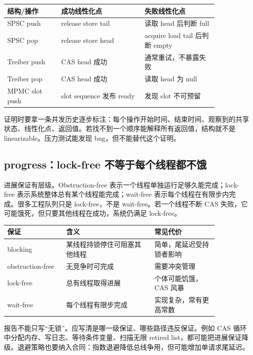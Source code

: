 \begin{center}
\begin{tabular}{p{0.22\linewidth}p{0.34\linewidth}p{0.30\linewidth}}
\toprule
结构/操作 & 成功线性化点 & 失败线性化点 \\
\midrule
SPSC push & release store tail & 读取 head 后判断 full \\
SPSC pop & release store head & acquire load tail 后判断 empty \\
Treiber push & CAS head 成功 & 通常重试，不暴露失败 \\
Treiber pop & CAS head 成功 & 读取 head 为 null \\
MPMC slot push & slot sequence 发布 ready & 发现 slot 不可预留 \\
\bottomrule
\end{tabular}
\end{center}

证明时要拿一条并发历史逐步标注：每个操作开始时间、结束时间、观察到的共享状态、线性化点、返回值。若找不到一个顺序能解释所有返回值，结构就不是 linearizable。压力测试能发现 bug，但不能替代这个证明。

\subsection{progress：lock-free 不等于每个线程都不饿}

进展保证有层级。Obstruction-free 表示一个线程单独运行足够久能完成；lock-free 表示系统整体总有某个线程能完成；wait-free 表示每个线程在有限步内完成。很多工程队列只是 lock-free，不是 wait-free。若一个线程不断 CAS 失败，它可能饿死，但只要其他线程在成功，系统仍满足 lock-free。

\begin{center}
\begin{tabular}{p{0.24\linewidth}p{0.36\linewidth}p{0.26\linewidth}}
\toprule
保证 & 含义 & 常见代价 \\
\midrule
blocking & 某线程持锁停住可阻塞其他线程 & 简单，尾延迟受持锁者影响 \\
obstruction-free & 无竞争时可完成 & 需要冲突管理 \\
lock-free & 总有线程取得进展 & 个体可能饥饿，CAS 风暴 \\
wait-free & 每个线程有限步完成 & 实现复杂，常有更高常数 \\
\bottomrule
\end{tabular}
\end{center}

报告不能只写“无锁”。应写清是哪一级保证、哪些路径违反保证。例如 CAS 循环中分配内存、写日志、等待条件变量、扫描无限 retired list，都可能把进展保证降级。退避策略也要纳入合同：指数退避降低总线争用，但可能增加单请求尾延迟。

